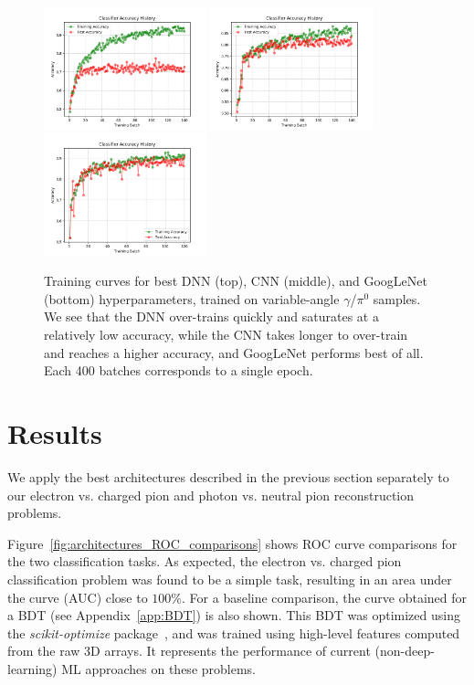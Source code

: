 \begin{figure}[htbp]
\centering
\includegraphics[width=0.42\textwidth]{Images/Calo/DNN_accuracy_batches_long.png}
\includegraphics[width=0.42\textwidth]{Images/Calo/CNN_accuracy_batches_long.png}
\includegraphics[width=0.42\textwidth]{Images/Calo/GN_accuracy_batches_long.png}
\caption{Training curves for best DNN (top), CNN (middle), and GoogLeNet (bottom) hyperparameters, trained on variable-angle $\gamma$/$\pi^0$ samples. We see that the DNN over-trains quickly and saturates at a relatively low accuracy, while the CNN takes longer to over-train and reaches a higher accuracy, and GoogLeNet performs best of all. Each 400 batches corresponds to a single epoch.}
\label{fig:training_curves_comparison_gamma_pi0}
\end{figure}

\section{Results}

We apply the best architectures described in the previous section separately to our electron vs. charged pion and photon vs. neutral pion reconstruction problems.

Figure~\ref{fig:architectures_ROC_comparisons} shows ROC curve comparisons for the two classification tasks. As expected, the electron vs. charged pion classification problem was found to be a simple task, resulting in an area under the curve (AUC) close to $100\%$. For a baseline comparison, the curve obtained for a BDT (see Appendix~\ref{app:BDT}) is also shown. This BDT was optimized using the {\it scikit-optimize} package~\cite{skopt}, and was trained using high-level features computed from the raw 3D arrays. It represents the performance of current (non-deep-learning) ML approaches on these problems.

